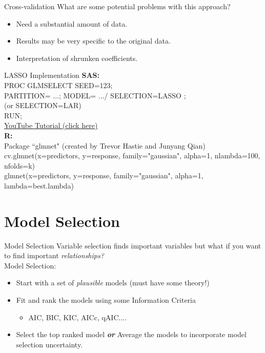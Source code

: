 \documentclass{beamer}\usepackage[]{graphicx}\usepackage[]{color}
\begin{document}
\begin{frame}{Cross-validation}
What are some potential problems with this approach?
\bigskip
\pause
\begin{itemize}
\item Need a substantial amount of data.
\pause
\bigskip
\item Results may be very specific to the original data.
\pause
\bigskip
\item Interpretation of shrunken coefficients.
\end{itemize}
\end{frame}

\begin{frame}{LASSO Implementation}
\textbf{SAS:}\\
PROC GLMSELECT  SEED=123;  \\
PARTITION= ...;
MODEL= .../ SELECTION=LASSO ;\\
(or SELECTION=LAR)\\
RUN;\\

\smallskip
\hyperlink{https://www.youtube.com/watch?v=bWhJ9ixN8e0}{YouTube Tutorial (click here)}\\

\bigskip
\textbf{R:}\\
Package ``glmnet" (created by Trevor Hastie and Junyang Qian)\\
\smallskip
cv.glmnet(x=predictors, y=response, family="gaussian", alpha=1, nlambda=100, nfolds=k)\\
\smallskip
glmnet(x=predictors, y=response, family="gaussian", alpha=1, lambda=best.lambda)\\

\end{frame}

\section{Model Selection}

\begin{frame}{Model Selection}
Variable selection finds important variables but what if you want to find important \emph{relationships?}\\
\pause
Model Selection:
\begin{itemize}
\pause
\item Start with a set of \emph{plausible} models (must have some theory!)
\pause
\item Fit and rank the models using some Information Criteria
  \begin{itemize}
  \item AIC, BIC, KIC, AICc, qAIC....
  \end{itemize}
  \pause
\item Select the top ranked model \textbf{\emph{or}} Average the models to incorporate model selection uncertainty.
\end{itemize}
\end{frame}
\end{document}
